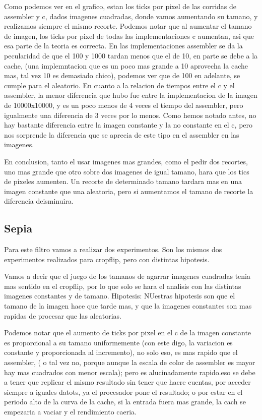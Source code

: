 \hfill \break
Como podemos ver en el grafico, estan los ticks por pixel de las corridas de assembler y c, dados imagenes cuadradas, donde vamos aumentando su tamano, y realizamos siempre el mismo recorte. 
Podemos notar que al aumentar el tamano de imagen, los ticks por pixel de todas las implementaciones c aumentan, asi que esa parte de la teoria es correcta. En las implementaciones assembler se da la pecularidad de que el 100 y 1000 tardan menos que el de 10, en parte se debe a la cache, (una implemntacion que es un poco mas grande a 10 aprovecha la cache mas, tal vez 10 es demasiado chico), podemos ver que de 100 en adelante, se cumple para el aleatorio.  
	En cuanto a la relacion de tiempos entre el c y el assembler, la menor diferencia que hubo fue entre la implementacion de la imagen de 10000x10000, y es un poco menos de 4 veces el tiempo del assembler, pero igualmente una diferencia de 3 veces por lo menos. Como hemos notado antes, no hay bastante diferencia  entre la imagen constante y la no constante en el c, pero nos sorprende la diferencia que se aprecia de este tipo en el assembler en las imagenes.   
	 
 \hfill \break
En conclusion, tanto el usar imagenes mas grandes, como el pedir dos recortes, uno mas grande que otro sobre dos imagenes de igual tamano, hara que los tics de pixeles aumenten. Un recorte de determinado tamano tardara mas en una imagen constante que una aleatoria, pero si aumentamos el tamano de  recorte la diferencia deisminuira. 

\hfill \break


\subsection{Sepia}

Para este filtro vamos a realizar dos experimentos. Son los mismos dos experimentos realizados para cropflip, pero con distintas hipotesis.
\hfill \break
 
   Vamos a decir que el juego de los tamanos de agarrar imagenes cuadradas tenia mas sentido en el cropflip, por lo que solo se hara el analisis con las distintas imagenes constantes y de tamano. 
   \hfill \break
   Hipotesis:  NUestras hipotesis son que el tamano de la imagen hace que tarde mas, y que la imagenes constantes son mas rapidas de procesar que las aleatorias.
   
   
   
   
   \hfill \break
   
   
   Podemos notar que  el aumento de ticks por pixel en el c de la imagen constante es proporcional a su tamano uniformemente (con este digo, la variacion es constante y proporcionada al incremento), no solo eso, es mas rapido que el assembler, ( o tal vez no, porque aunque la escala de color de assembler es mayor  hay mas cuadrados con menor escala); pero es alucinadamente rapido.eso se debe a tener que replicar el mismo resultado sin tener que hacre cuentas, por acceder siempre a iguales datots, ya el procesador pone el resultado; o por estar en el periodo alto de la curva de la cache, si la entrada fuera mas grande, la cach se empezaria a vaciar y el rendimiento caeria.
   
